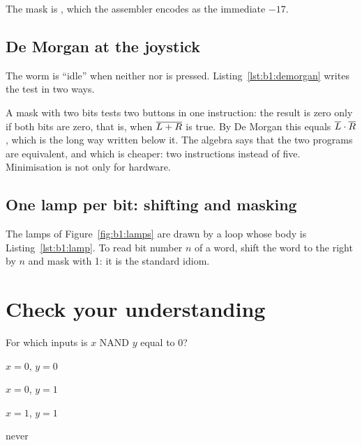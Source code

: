 The mask  is , which the assembler
encodes as the immediate $-17$.

\subsection{De Morgan at the joystick}

The worm is ``idle'' when neither  nor  is pressed.
Listing~\ref{lst:b1:demorgan} writes the test in two ways.


A mask with two bits tests two buttons in one instruction: the result is zero
only if both bits are zero, that is, when $\overline{L+R}$ is true. By De Morgan
this equals $\overline{L}\cdot\overline{R}$, which is the long way written below it.
The algebra says that the two programs are equivalent, and which is cheaper:
two instructions instead of five. Minimisation is not only for hardware.

\subsection{One lamp per bit: shifting and masking}

The lamps of Figure~\ref{fig:b1:lamps} are drawn by a loop whose body is
Listing~\ref{lst:b1:lamp}. To read bit number $n$ of a word, shift the word
to the right by $n$ and mask with 1: it is the standard idiom.






\section{Check your understanding}

\begin{quiz}{For which inputs is $x$ NAND $y$ equal to 0?}
\item $x=0$, $y=0$
\item $x=0$, $y=1$
\item $x=1$, $y=1$
\item never
\end{quiz}

